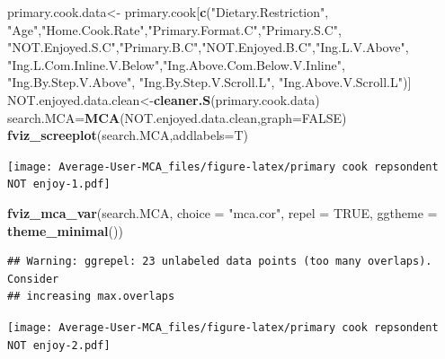 \documentclass[
]{article}
\newenvironment{Shaded}{\begin{snugshade}}{\end{snugshade}}
\newcommand{\DataTypeTok}[1]{\textcolor[rgb]{0.13,0.29,0.53}{#1}}
\newcommand{\KeywordTok}[1]{\textcolor[rgb]{0.13,0.29,0.53}{\textbf{#1}}}
\newcommand{\NormalTok}[1]{#1}
\newcommand{\OtherTok}[1]{\textcolor[rgb]{0.56,0.35,0.01}{#1}}
\newcommand{\StringTok}[1]{\textcolor[rgb]{0.31,0.60,0.02}{#1}}
\begin{document}
\begin{Shaded}
\begin{Highlighting}[]
\NormalTok{primary.cook.data<-}\StringTok{ }\NormalTok{primary.cook[}\KeywordTok{c}\NormalTok{(}\StringTok{"Dietary.Restriction"}\NormalTok{, }\StringTok{"Age"}\NormalTok{,}\StringTok{"Home.Cook.Rate"}\NormalTok{,}\StringTok{"Primary.Format.C"}\NormalTok{,}\StringTok{"Primary.S.C"}\NormalTok{,}
            \StringTok{"NOT.Enjoyed.S.C"}\NormalTok{,}\StringTok{"Primary.B.C"}\NormalTok{,}\StringTok{"NOT.Enjoyed.B.C"}\NormalTok{,}\StringTok{"Ing.L.V.Above"}\NormalTok{,}
            \StringTok{"Ing.L.Com.Inline.V.Below"}\NormalTok{,}\StringTok{"Ing.Above.Com.Below.V.Inline"}\NormalTok{,  }\StringTok{"Ing.By.Step.V.Above"}\NormalTok{,  }\StringTok{"Ing.By.Step.V.Scroll.L"}\NormalTok{,}
            \StringTok{"Ing.Above.V.Scroll.L"}\NormalTok{)]}
\NormalTok{NOT.enjoyed.data.clean<-}\KeywordTok{cleaner.S}\NormalTok{(primary.cook.data)}
\NormalTok{search.MCA=}\KeywordTok{MCA}\NormalTok{(NOT.enjoyed.data.clean,}\DataTypeTok{graph=}\OtherTok{FALSE}\NormalTok{)}
\KeywordTok{fviz_screeplot}\NormalTok{(search.MCA,}\DataTypeTok{addlabels=}\NormalTok{T)}
\end{Highlighting}
\end{Shaded}

\texttt{[image: Average-User-MCA\_files/figure-latex/primary cook repsondent NOT enjoy-1.pdf]}

\begin{Shaded}
\begin{Highlighting}[]
\KeywordTok{fviz_mca_var}\NormalTok{(search.MCA, }\DataTypeTok{choice =} \StringTok{"mca.cor"}\NormalTok{, }\DataTypeTok{repel =} \OtherTok{TRUE}\NormalTok{,}
             \DataTypeTok{ggtheme =} \KeywordTok{theme_minimal}\NormalTok{())}
\end{Highlighting}
\end{Shaded}

\begin{verbatim}
## Warning: ggrepel: 23 unlabeled data points (too many overlaps). Consider
## increasing max.overlaps
\end{verbatim}

\texttt{[image: Average-User-MCA\_files/figure-latex/primary cook repsondent NOT enjoy-2.pdf]}

\begin{Shaded}
\end{Shaded}
\end{document}
